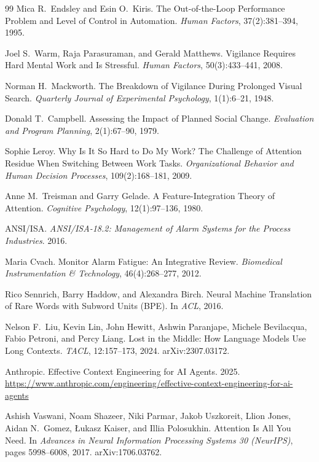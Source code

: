 \documentclass[11pt,a4paper]{article}
\theoremstyle{definition}
\theoremstyle{plain}
\begin{document}
\begin{thebibliography}{99}
Mica R.\ Endsley and Esin O.\ Kiris.
\newblock The Out-of-the-Loop Performance Problem and Level of Control in Automation.
\newblock \textit{Human Factors}, 37(2):381--394, 1995.

Joel S.\ Warm, Raja Parasuraman, and Gerald Matthews.
\newblock Vigilance Requires Hard Mental Work and Is Stressful.
\newblock \textit{Human Factors}, 50(3):433--441, 2008.

Norman H.\ Mackworth.
\newblock The Breakdown of Vigilance During Prolonged Visual Search.
\newblock \textit{Quarterly Journal of Experimental Psychology}, 1(1):6--21, 1948.

Donald T.\ Campbell.
\newblock Assessing the Impact of Planned Social Change.
\newblock \textit{Evaluation and Program Planning}, 2(1):67--90, 1979.

Sophie Leroy.
\newblock Why Is It So Hard to Do My Work? The Challenge of Attention Residue When Switching Between Work Tasks.
\newblock \textit{Organizational Behavior and Human Decision Processes}, 109(2):168--181, 2009.

Anne M.\ Treisman and Garry Gelade.
\newblock A Feature-Integration Theory of Attention.
\newblock \textit{Cognitive Psychology}, 12(1):97--136, 1980.

ANSI/ISA.
\newblock \textit{ANSI/ISA-18.2: Management of Alarm Systems for the Process Industries}. 2016.

Maria Cvach.
\newblock Monitor Alarm Fatigue: An Integrative Review.
\newblock \textit{Biomedical Instrumentation \& Technology}, 46(4):268--277, 2012.

Rico Sennrich, Barry Haddow, and Alexandra Birch.
\newblock Neural Machine Translation of Rare Words with Subword Units (BPE).
\newblock In \textit{ACL}, 2016.

Nelson F.\ Liu, Kevin Lin, John Hewitt, Ashwin Paranjape, Michele Bevilacqua, Fabio Petroni, and Percy Liang.
\newblock Lost in the Middle: How Language Models Use Long Contexts.
\newblock \textit{TACL}, 12:157--173, 2024. arXiv:2307.03172.

Anthropic.
\newblock Effective Context Engineering for AI Agents. 2025.
\newblock \url{https://www.anthropic.com/engineering/effective-context-engineering-for-ai-agents}

Ashish Vaswani, Noam Shazeer, Niki Parmar, Jakob Uszkoreit, Llion Jones, Aidan N.\ Gomez, \L{}ukasz Kaiser, and Illia Polosukhin.
\newblock Attention Is All You Need.
\newblock In \textit{Advances in Neural Information Processing Systems 30 (NeurIPS)}, pages 5998--6008, 2017. arXiv:1706.03762.


\end{thebibliography}
\end{document}
